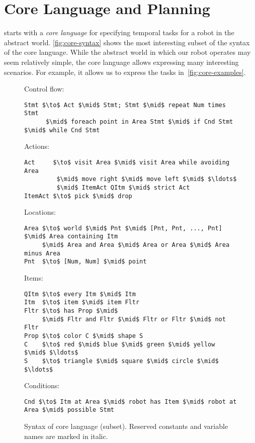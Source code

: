 \section{Core Language and Planning}
\label{sec:coreLanguage}

\tool starts with a \emph{core language} for specifying temporal tasks for a robot in
the abstract world.
\autoref{fig:core-syntax} shows the most interesting subset of the syntax
of the core language.
While the abstract world in which our robot operates may seem relatively simple,
the core language allows expressing many interesting scenarios.
For example, it allows us to express the tasks in~\autoref{fig:core-examples}.

\begin{figure}
  Control flow:
  \begin{lstlisting}
Stmt $\to$ Act $\mid$ Stmt; Stmt $\mid$ repeat Num times Stmt
      $\mid$ foreach point in Area Stmt $\mid$ if Cnd Stmt $\mid$ while Cnd Stmt
  \end{lstlisting}
  Actions:
  \begin{lstlisting}
Act     $\to$ visit Area $\mid$ visit Area while avoiding Area
         $\mid$ move right $\mid$ move left $\mid$ $\ldots$
         $\mid$ ItemAct QItm $\mid$ strict Act
ItemAct $\to$ pick $\mid$ drop
  \end{lstlisting}
  Locations:
  \begin{lstlisting}
Area $\to$ world $\mid$ Pnt $\mid$ [Pnt, Pnt, ..., Pnt] $\mid$ Area containing Itm
     $\mid$ Area and Area $\mid$ Area or Area $\mid$ Area minus Area
Pnt  $\to$ [Num, Num] $\mid$ point
  \end{lstlisting}
  Items:
  \begin{lstlisting}
QItm $\to$ every Itm $\mid$ Itm
Itm  $\to$ item $\mid$ item Fltr
Fltr $\to$ has Prop $\mid$
     $\mid$ Fltr and Fltr $\mid$ Fltr or Fltr $\mid$ not Fltr
Prop $\to$ color C $\mid$ shape S
C    $\to$ red $\mid$ blue $\mid$ green $\mid$ yellow $\mid$ $\ldots$
S    $\to$ triangle $\mid$ square $\mid$ circle $\mid$ $\ldots$
  \end{lstlisting}
  Conditions:
  \begin{lstlisting}
Cnd $\to$ Itm at Area $\mid$ robot has Item $\mid$ robot at Area $\mid$ possible Stmt
  \end{lstlisting}
  \caption{Syntax of core language (subset). Reserved constants and variable
  names are marked in italic.}
  \label{fig:core-syntax}
\end{figure}

